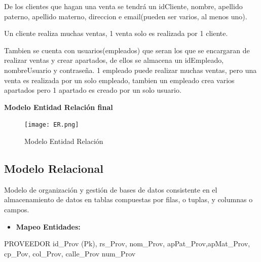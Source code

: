 \documentclass[30pt,fleqn]{article}
\begin{document}
\begin{itemize}
De los clientes que hagan una venta se tendrá un idCliente, nombre, apellido paterno, apellido materno, direccion e email(pueden ser varios, al menos uno).

Un cliente realiza muchas ventas, 1 venta solo es realizada por 1 cliente.


\vspace{10mm} %

Tambien se cuenta con usuarios(empleados) que seran los que se encargaran de realizar ventas y crear apartados, de ellos se almacena un idEmpleado, nombreUsuario y contraseña. 1 empleado puede realizar muchas ventas, pero una venta es realizada por un solo empleado, tambien un empleado crea varios apartados pero 1 apartado es creado por un solo usuario.


\end{itemize}

\vspace{50mm} %
\item\textbf{Modelo Entidad Relación final}


\begin{figure}[h]
    \centering
    \texttt{[image: ER.png]}
    \caption{Modelo Entidad Relación}
    \label{fig:Modelo Entidad Relació}
\end{figure}

\vspace{10mm} %

\subsection{Modelo Relacional}

\vspace{5mm} %

Modelo de organización y gestión de bases de datos consistente en el almacenamiento de datos en tablas compuestas por filas, o tuplas, y columnas o campos.

\vspace{5mm} %

\begin{itemize}
\vspace{5mm} %
\item\textbf{Mapeo Entidades:}
\end{itemize}

\vspace{10mm} %
 PROVEEDOR {id_Prov (Pk), rs_Prov, nom_Prov, apPat_Prov,apMat_Prov, cp_Pov, col_Prov, calle_Prov num_Prov}
 
\end{document}
